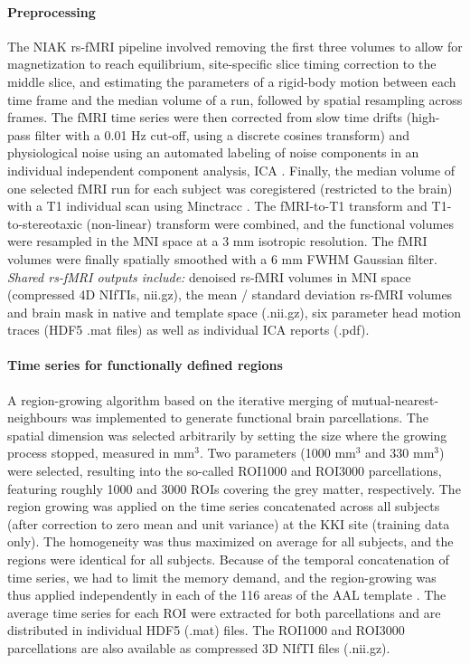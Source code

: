 \documentclass[preprint,12pt,3p]{elsarticle}
\begin{document}
\paragraph{Preprocessing} The NIAK rs-fMRI pipeline involved removing the first three volumes to allow for magnetization to reach equilibrium, site-specific slice timing correction to the middle slice, and estimating the parameters of a rigid-body motion between each time frame and the median volume of a run, followed by spatial resampling across frames. The fMRI time series were then corrected from slow time drifts (high-pass filter with a 0.01 Hz cut-off, using a discrete cosines transform) and physiological noise using an automated labeling of noise components in an individual independent component analysis, ICA \citep{perlbarg2007corsica}. Finally, the median volume of one selected fMRI run for each subject was coregistered (restricted to the brain) with a T1 individual scan using Minctracc \cite{collins1994automatic}. The fMRI-to-T1 transform and T1-to-stereotaxic (non-linear) transform were combined, and the functional volumes were resampled in the MNI space at a 3 mm isotropic resolution. The fMRI volumes were finally spatially smoothed with a 6 mm FWHM Gaussian filter. \emph{Shared rs-fMRI outputs include:} denoised rs-fMRI volumes in MNI space (compressed 4D NIfTIs, nii.gz), the mean / standard deviation rs-fMRI volumes and brain mask in native and template space (.nii.gz), six parameter head motion traces (HDF5 .mat files) as well as individual ICA reports (.pdf).   

\paragraph{Time series for functionally defined regions} A region-growing algorithm \citep{bellec2006identification} based on the iterative merging of mutual-nearest-neighbours was implemented to generate functional brain parcellations. The spatial dimension was selected arbitrarily by setting the size where the growing process stopped, measured in mm$^3$. Two parameters (1000 mm$^3$ and 330 mm$^3$) were selected, resulting into the so-called ROI1000 and ROI3000 parcellations, featuring roughly 1000 and 3000 ROIs covering the grey matter, respectively. The region growing was applied on the time series concatenated across all subjects (after correction to zero mean and unit variance) at the KKI site (training data only). The homogeneity was thus maximized on average for all subjects, and the regions were identical for all subjects. Because of the temporal concatenation of time series, we had to limit the memory demand, and the region-growing was thus applied independently in each of the 116 areas of the AAL template \citep{tzourio2002automated}. The average time series for each ROI were extracted for both parcellations and are distributed in individual HDF5 (.mat) files. The ROI1000 and ROI3000 parcellations are also available as compressed 3D NIfTI files (.nii.gz).
\end{document}

